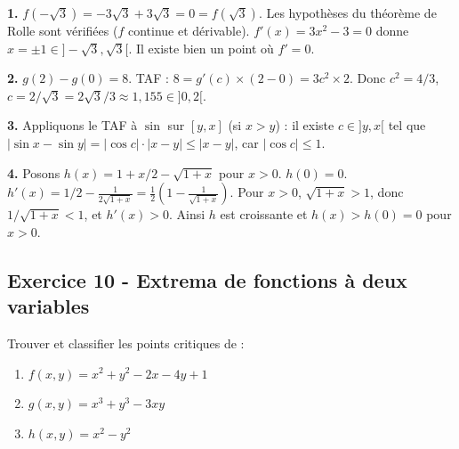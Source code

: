 \documentclass[12pt,a4paper]{article}
\begin{document}
\begin{boitecorrige}
\textbf{1.} $f(-\sqrt{3}) = -3\sqrt{3}+3\sqrt{3} = 0 = f(\sqrt{3})$. Les hypothèses du théorème de Rolle sont vérifiées ($f$ continue et dérivable). $f'(x)=3x^2-3=0$ donne $x=\pm1\in]-\sqrt{3},\sqrt{3}[$. Il existe bien un point où $f'=0$.

\textbf{2.} $g(2)-g(0) = 8$. TAF : $8 = g'(c)\times(2-0) = 3c^2\times2$. Donc $c^2 = 4/3$, $c = 2/\sqrt{3} = 2\sqrt{3}/3 \approx 1{,}155 \in ]0,2[$.

\textbf{3.} Appliquons le TAF à $\sin$ sur $[y, x]$ (si $x>y$) : il existe $c\in]y,x[$ tel que
$|\sin x-\sin y| = |\cos c|\cdot|x-y| \leq |x-y|$, car $|\cos c|\leq 1$.

\textbf{4.} Posons $h(x) = 1+x/2 - \sqrt{1+x}$ pour $x>0$. $h(0)=0$.
$h'(x) = 1/2 - \frac{1}{2\sqrt{1+x}} = \frac{1}{2}\left(1-\frac{1}{\sqrt{1+x}}\right)$.
Pour $x>0$, $\sqrt{1+x}>1$, donc $1/\sqrt{1+x}<1$, et $h'(x)>0$. Ainsi $h$ est croissante et $h(x)>h(0)=0$ pour $x>0$.
\end{boitecorrige}

\subsection*{Exercice 10 - Extrema de fonctions à deux variables \niveau{\difficile}}

\begin{boiteexercice}
Trouver et classifier les points critiques de :
\begin{enumerate}[label=(\alph*)]
  \item $f(x,y) = x^2 + y^2 - 2x - 4y + 1$
  \item $g(x,y) = x^3 + y^3 - 3xy$
  \item $h(x,y) = x^2 - y^2$
\end{enumerate}
\end{boiteexercice}
\end{document}
